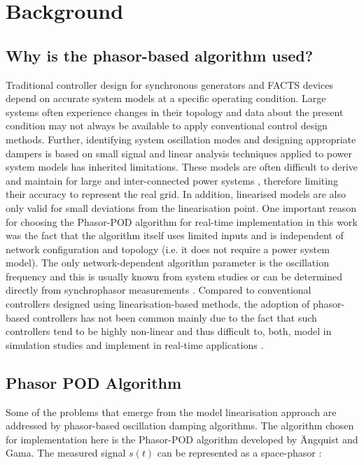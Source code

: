 \documentclass{ieeeaccess}
\begin{document}
\section{Background}\label{Background}

\subsection{Why is the phasor-based algorithm used?} 
Traditional controller design for synchronous generators and FACTS devices depend on accurate system models at a specific operating condition. Large systems often experience changes in their topology and data about the present condition may not always be available to apply conventional control design methods. Further, identifying system oscillation modes and designing appropriate dampers is based on small signal and linear analysis techniques applied to power system models has inherited limitations. These models are often difficult to derive and maintain for large and inter-connected power systems \cite{WAMTCSC}, therefore limiting their accuracy to represent the real grid. In addition, linearised models are also only valid for small deviations from the linearisation point. One important reason for choosing the Phasor-POD algorithm for real-time implementation in this work was the fact that the algorithm itself uses limited inputs and is independent of network configuration and topology (i.e. it does not require a power system model). The only network-dependent algorithm parameter is the oscillation frequency and this is usually known from system studies or can be determined directly from synchrophasor measurements \cite{TaskForce}. Compared to conventional controllers designed using linearisation-based methods, the adoption of phasor-based controllers has not been common mainly due to the fact that such controllers tend to be highly non-linear and thus difficult to, both, model in simulation studies \cite{Chaudhuri} and implement in real-time applications \cite{WAPODNorway}.

\subsection{Phasor POD Algorithm}

Some of the problems that emerge from the model linearisation approach are addressed by phasor-based oscillation damping algorithms. The algorithm chosen for implementation here is the Phasor-POD algorithm developed by \"{A}ngquist and Gama\cite{PhasorPOD}. The measured signal $s(t)$ can be represented as a space-phasor \cite{Chaudhuri}: 
\end{document}
